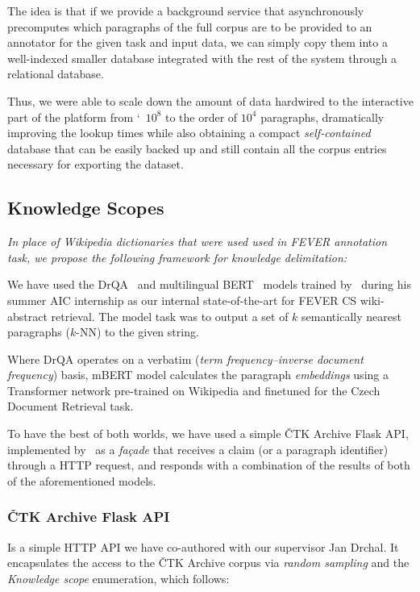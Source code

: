 The idea is that if we provide a background service that asynchronously precomputes which paragraphs of the full corpus are to be provided to an annotator for the given task and input data, we can simply copy them into a well-indexed smaller database integrated with the rest of the system through a relational database. 

Thus, we were able to scale down the amount of data hardwired to the interactive part of the platform from \char`~$10^8$ to the order of $10^4$ paragraphs, dramatically improving the lookup times while also obtaining a compact \textit{self-contained}  database that can be easily backed up and still contain all the corpus entries necessary for exporting the dataset.


\subsection{Knowledge Scopes}
\label{sec:knowledge-scopes}
\textit{In place of \textsf{Wikipedia} \textit{dictionaries} that were used used in \textsf{FEVER} annotation task, we propose the following framework for knowledge delimitation:}



We have used the \textsf{DrQA}~\cite{drqa} and \textsf{multilingual BERT}~\cite{bert} models trained by~\cite{michal} during his summer \textsf{AIC} internship as our internal state-of-the-art for \textsf{FEVER CS} \textsf{wiki-}abstract retrieval. The model task was to output a set of $k$ semantically nearest paragraphs ($k$-NN) to the given string.

Where \textsf{DrQA} operates on a verbatim (\textit{term frequency–inverse document frequency}) basis, \textsf{mBERT} model calculates the paragraph \textit{embeddings} using a Transformer network pre-trained on \textsf{Wikipedia} and finetuned for the Czech Document Retrieval task.

To have the best of both worlds, we have used a simple \textsf{ČTK Archive Flask API}, implemented by~\cite{honzagit} as a \textit{façade} that receives a claim (or a paragraph identifier) through a \textsf{HTTP} request, and responds with a combination of the results of both of the aforementioned models.

\subsubsection{ČTK Archive Flask API}
Is a simple \textsf{HTTP API} we have co-authored with our supervisor Jan Drchal. It encapsulates the access to the \textsf{ČTK Archive} corpus via \textit{random sampling} and the \textit{Knowledge scope} enumeration, which follows:

